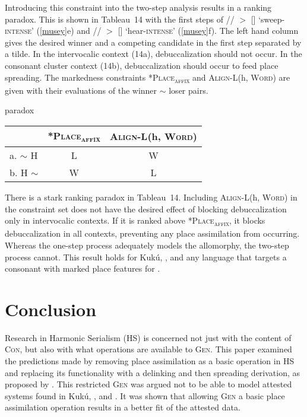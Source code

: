 \documentclass[output=paper]{LSP/langsci}
\begin{document}
Introducing this constraint into the two-step analysis results in a ranking paradox. This is shown in Tableau~14 with the first steps of // $>$ [] `sweep-\textsc{intense}' (\ref{musey}e) and // $>$ [] `hear-\textsc{intense}' (\ref{musey}f). The left hand column gives the desired winner and a competing candidate in the first step separated by a tilde. In the intervocalic context (14a), debuccalization should not occur. In the consonant cluster context (14b), debuccalization should occur to feed place spreading. The markedness constraints \textsc{*Place\textsubscript{affix}} and \textsc{Align-L(}h, \textsc{Word)} are given with their evaluations of the winner $\sim$ loser pairs.

\begin{table}[ht]
    		{paradox}
    \begin{tabular}{|l||c:c|} \hline
    &
    	\textsc{*Place\textsubscript{affix}} &
        \textsc{Align-L(}h, \textsc{Word)} \\
    \hline \hline
	a.  $\sim$ H   & L & W \\ \hline
    b. H $\sim$    & W & L \\ \hline
    \end{tabular}
\end{table}

There is a stark ranking paradox in Tableau~14. Including \textsc{Align-L(}h, \textsc{Word)} in the constraint set does not have the desired effect of blocking debuccalization only in intervocalic contexts. If it is ranked above \textsc{*Place\textsubscript{affix}}, it blocks debuccalization in all contexts, preventing any place assimilation from occurring. Whereas the one-step process adequately models the  allomorphy, the two-step process cannot. This result holds for Kuk\'u, , and any language that targets a consonant with marked place features for .

\section{Conclusion}\label{sec:lamont:4}

Research in Harmonic Serialism (HS) is concerned not just with the content of \textsc{Con}, but also with what operations are available to \textsc{Gen}. This paper examined the predictions made by removing place assimilation as a basic operation in HS and replacing its functionality with a delinking and then spreading derivation, as proposed by \citet{mccarthy2007,mccarthy2008}. This restricted \textsc{Gen} was argued not to be able to model attested  systems found in Kuk\'u, , and . It was shown that allowing \textsc{Gen} a basic place assimilation operation results in a better fit of the attested data.
\end{document}
